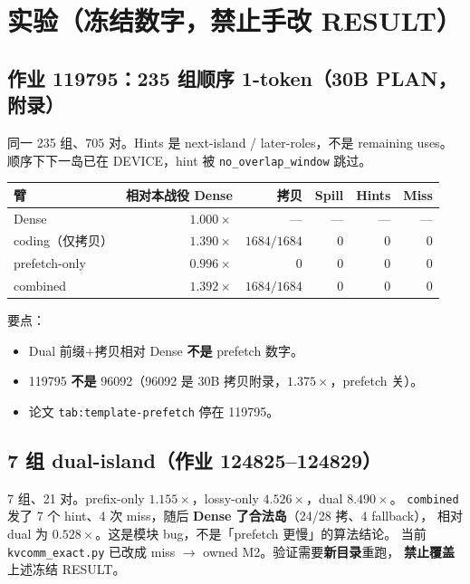 \documentclass[UTF8,a4paper,11pt,fontset=fandol]{ctexart}
\begin{document}
\section{实验（冻结数字，禁止手改 RESULT）}

\subsection{作业 119795：235 组顺序 1-token（30B PLAN，附录）}

同一 235 组、$705$ 对。Hints 是 next-island / later-roles，不是 remaining uses。
顺序下下一岛已在 DEVICE，hint 被 \texttt{no\_overlap\_window} 跳过。

\begin{center}
\small
\begin{tabular}{lrrrrr}
\toprule
\textbf{臂} & \textbf{相对本战役 Dense} & \textbf{拷贝} & \textbf{Spill} & \textbf{Hints} & \textbf{Miss} \\
\midrule
Dense & $1.000\times$ & --- & --- & --- & --- \\
coding（仅拷贝） & $1.390\times$ & $1684/1684$ & $0$ & $0$ & $0$ \\
prefetch-only & $0.996\times$ & $0$ & $0$ & $0$ & $0$ \\
combined & $1.392\times$ & $1684/1684$ & $0$ & $0$ & $0$ \\
\bottomrule
\end{tabular}
\end{center}

要点：

\begin{itemize}
  \item Dual 前缀$+$拷贝相对 Dense \textbf{不是} prefetch 数字。
  \item 119795 \textbf{不是} 96092（96092 是 30B 拷贝附录，$1.375\times$，prefetch 关）。
  \item 论文 \texttt{tab:template-prefetch} 停在 119795。
\end{itemize}

\subsection{7 组 dual-island（作业 124825--124829）}

7 组、21 对。prefix-only $1.155\times$，lossy-only $4.526\times$，dual $8.490\times$。
\texttt{combined} 发了 7 个 hint、4 次 miss，随后 \textbf{Dense 了合法岛}（24/28 拷、4 fallback），
相对 dual 为 $0.528\times$。这是模块 bug，不是「prefetch 更慢」的算法结论。
当前 \texttt{kvcomm\_exact.py} 已改成 miss $\to$ owned M2。验证需要\textbf{新目录}重跑，
\textbf{禁止覆盖}上述冻结 RESULT。
\end{document}

